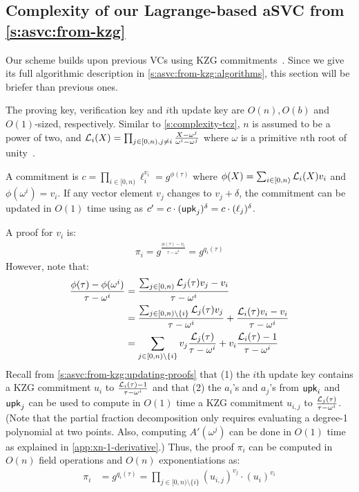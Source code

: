 \subsection{Complexity of our Lagrange-based aSVC from \cref{s:asvc:from-kzg}}
\label{s:complexity-lagrange-asvc}
Our scheme builds upon previous VCs using KZG commitments~\cite{CDHK15, KZG10a}.
Since we give its full algorithmic description in \cref{s:asvc:from-kzg:algorithms}, this section will be briefer than previous ones.

The proving key, verification key and $i$th update key are $O(n), O(b)$ and $O(1)$-sized, respectively.
Similar to \cref{s:complexity-tcz}, $n$ is assumed to be a power of two, and $\mathcal{L}_i(X)=\prod_{j\in [0,n),j\ne i} \frac{X-\omega^j}{\omega^i - \omega^j}$ where $\omega$ is a primitive $n$th root of unity~\cite{vG13ModernCh8}.

A commitment is $c=\prod_{i\in[0,n)} \ell_i^{v_i}=g^{\phi(\tau)}$ where $\phi(X)=\sum_{i\in [0,n)} \mathcal{L}_i(X) v_i$ and $\phi(\omega^i) = v_i$.
If any vector element $v_j$ changes to $v_j + \delta$, the commitment can be updated in $O(1)$ time using as $c' = c \cdot (\mathsf{upk}_j)^{\delta} = c\cdot (\ell_j)^{\delta}$.

\label{s:complexity-lagrange-asvc:proof}
A proof for $v_i$ is:
\begin{align}
\pi_i = g^{\frac{\phi(\tau)-v_i}{\tau - \omega^i}} = g^{q_i(\tau)}
\end{align}
However, note that:
\begin{align}
\frac{\phi(\tau)-\phi(\omega^i)}{\tau - \omega^i}
 &= \frac{\sum_{j\in [0,n)} \mathcal{L}_j(\tau) v_j - v_i}{\tau - \omega^i}\\
 &= \frac{\sum_{j\in [0,n)\setminus \{i\}} \mathcal{L}_j(\tau) v_j}{\tau - \omega^i} + \frac{\mathcal{L}_i(\tau)v_i - v_i}{\tau - \omega^i}\\
  &= \sum_{j\in [0,n)\setminus \{i\}}v_j\frac{\mathcal{L}_j(\tau)}{\tau - \omega^i} + v_i\frac{\mathcal{L}_i(\tau) - 1}{\tau - \omega^i}
\end{align}
Recall from \cref{s:asvc:from-kzg:updating-proofs} that (1) the $i$th update key contains a KZG commitment $u_i$ to $\frac{\mathcal{L}_i(\tau) - 1}{\tau - \omega^i}$ and that (2) the $a_i$'s and $a_j$'s from $\mathsf{upk}_i$ and $\mathsf{upk}_j$ can be used to compute in $O(1)$ time a KZG commitment $u_{i,j}$ to $\frac{\mathcal{L}_j(\tau)}{\tau - \omega^i}$.
(Note that the partial fraction decomposition only requires evaluating a degree-1 polynomial at two points. Also, computing $A'(\omega^j)$ can be done in $O(1)$ time as explained in \cref{app:xn-1-derivative}.)
Thus, the proof $\pi_i$ can be computed in $O(n)$ field operations and $O(n)$ exponentiations as:
\begin{align}
\pi_i &= g^{q_i(\tau)}=\prod_{j\in [0,n)\setminus \{i\}} \left(u_{i,j}\right)^{v_j} \cdot \left(u_i\right)^{v_i}
\end{align}

